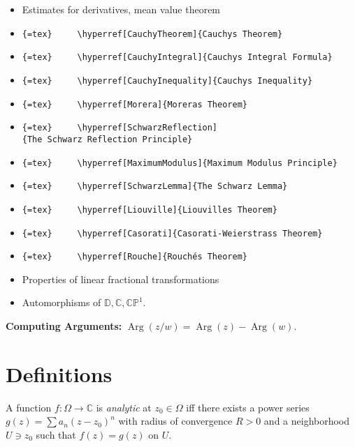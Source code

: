 \begin{itemize}
\item
  Estimates for derivatives, mean value theorem
\item
  \texttt{\{=tex\}\ \ \ \ \ \textbackslash{}hyperref{[}CauchyTheorem{]}\{Cauchy\textquotesingle{}s\ Theorem\}}
\item
  \texttt{\{=tex\}\ \ \ \ \ \textbackslash{}hyperref{[}CauchyIntegral{]}\{Cauchy\textquotesingle{}s\ Integral\ Formula\}}
\item
  \texttt{\{=tex\}\ \ \ \ \ \textbackslash{}hyperref{[}CauchyInequality{]}\{Cauchy\textquotesingle{}s\ Inequality\}}
\item
  \texttt{\{=tex\}\ \ \ \ \ \textbackslash{}hyperref{[}Morera{]}\{Morera\textquotesingle{}s\ Theorem\}}
\item
  \texttt{\{=tex\}\ \ \ \ \ \textbackslash{}hyperref{[}SchwarzReflection{]}\{The\ Schwarz\ Reflection\ Principle\}}
\item
  \texttt{\{=tex\}\ \ \ \ \ \textbackslash{}hyperref{[}MaximumModulus{]}\{Maximum\ Modulus\ Principle\}}
\item
  \texttt{\{=tex\}\ \ \ \ \ \textbackslash{}hyperref{[}SchwarzLemma{]}\{The\ Schwarz\ Lemma\}}
\item
  \texttt{\{=tex\}\ \ \ \ \ \textbackslash{}hyperref{[}Liouville{]}\{Liouville\textquotesingle{}s\ Theorem\}}
\item
  \texttt{\{=tex\}\ \ \ \ \ \textbackslash{}hyperref{[}Casorati{]}\{Casorati-Weierstrass\ Theorem\}}
\item
  \texttt{\{=tex\}\ \ \ \ \ \textbackslash{}hyperref{[}Rouche{]}\{Rouché\textquotesingle{}s\ Theorem\}}
\item
  Properties of linear fractional transformations
\item
  Automorphisms of \({\mathbb{D}}, {\mathbb{C}}, {\mathbb{CP}}^1\).
\end{itemize}

\textbf{Computing Arguments:}
\(\operatorname{Arg}(z/w) = \operatorname{Arg}(z) - \operatorname{Arg}(w)\).

\hypertarget{definitions}{%
\section{Definitions}\label{definitions}}

\begin{definition}[Analytic]

A function \(f:\Omega \to {\mathbb{C}}\) is \emph{analytic} at
\(z_0\in \Omega\) iff there exists a power series
\(g(z) = \sum a_n (z-z_0)^n\) with radius of convergence \(R>0\) and a
neighborhood \(U\ni z_0\) such that \(f(z) = g(z)\) on \(U\).

\end{definition}

